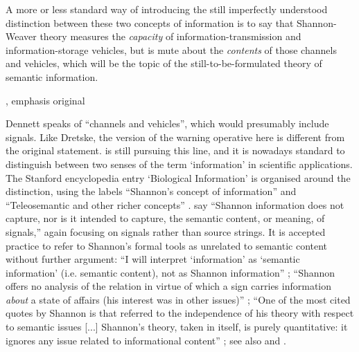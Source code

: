 \documentclass[12pt]{article}
\begin{document}
\begin{myquote}
A more or less standard way of introducing the still imperfectly understood distinction between these two concepts of information is to say that Shannon-Weaver theory measures the \emph{capacity} of information-transmission and information-storage vehicles, but is mute about the \emph{contents} of those channels and vehicles, which will be the topic of the still-to-be-formulated theory of semantic information.
\par\hspace*{\fill}\citet[344]{dennett1983intentional}, emphasis original
\end{myquote}

\noindent Dennett speaks of ``channels and vehicles'', which would presumably include signals.
Like Dretske, the version of the warning operative here is different from the original statement.
\citet[$\S$6]{dennett2017bacteria} is still pursuing this line, and it is nowadays standard to distinguish between two senses of the term `information' in scientific applications.
The Stanford encyclopedia entry `Biological Information' is organised around the distinction, using the labels ``Shannon's concept of information'' and ``Teleosemantic and other richer concepts'' \citep{godfrey-smith2016biological}.
\citet[21]{piccinini2011information} say ``Shannon information does not capture, nor is it intended to capture, the semantic content, or meaning, of signals,'' again focusing on signals rather than source strings.
It is accepted practice to refer to Shannon's formal tools as unrelated to semantic content without further argument: ``I will interpret ‘information’ as ‘semantic information’ (i.e. semantic content), not as Shannon information'' \citep[p. 12 n. 14]{artiga2020signals}; ``Shannon offers no analysis of the relation in virtue of which a sign carries information \textit{about} a state of affairs (his interest was in other issues)''  \citep[p. 7, emphasis original]{neander2017mark}; ``One of the most cited quotes by Shannon is that referred to the independence of his theory with respect to semantic issues [...] Shannon’s theory, taken in itself, is purely quantitative: it ignores any issue related to informational content'' \citep[1988-9]{lombardi2015shannon}; see also \citet[6]{cao2020new} and \citet[1]{kolchinsky2018semantic}.
\end{document}
